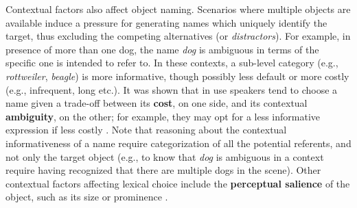 Contextual factors also affect object naming. Scenarios where multiple objects are available induce a pressure for generating names which uniquely identify the target, thus excluding the competing alternatives (or \textit{distractors})\cite{olson1970language}. For example, in presence of more than one dog, the name \textit{dog} is ambiguous in terms of the specific one is intended to refer to. In these contexts, a sub-level category (e.g., \textit{rottweiler}, \textit{beagle}) is more informative, though possibly less default or more costly (e.g., infrequent, long etc.). It was shown that in use speakers tend to choose a name given a trade-off between its \textbf{cost}, on one side, and its contextual \textbf{ambiguity}, on the other; for example, they may opt for a less informative expression if less costly \cite{rohde2012communicating} \cite{graf2016animal}. Note that reasoning about the contextual informativeness of a name require categorization of all the potential referents, and not only the target object (e.g., to know that \textit{dog} is ambiguous in a context require having recognized that there are multiple dogs in the scene). Other contextual factors affecting lexical choice include the \textbf{perceptual salience} of the object, such as its size or prominence \cite{clark1983common}.



	

